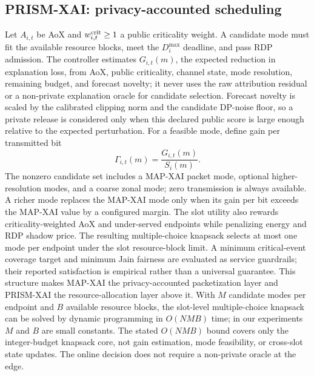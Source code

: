 \documentclass[conference]{IEEEtran}
\newcommand{\method}{PRISM-XAI}
\newcommand{\mapxai}{MAP-XAI}
\newcommand{\medmath}[1]{#1}
\begin{document}
\subsection{PRISM-XAI: privacy-accounted scheduling}
\begingroup
\setlength{\abovedisplayskip}{4pt}
\setlength{\belowdisplayskip}{4pt}
\setlength{\abovedisplayshortskip}{2pt}
\setlength{\belowdisplayshortskip}{2pt}
Let $A_{i,t}$ be AoX and $w^{\rm crit}_{i,t}\geq 1$ a public
criticality weight. A candidate mode must fit the available resource
blocks, meet the $D_i^{\max}$ deadline, and pass RDP admission. The
controller estimates $G_{i,t}(m)$, the expected reduction in explanation
loss, from AoX, public criticality, channel state, mode resolution, remaining
budget, and forecast novelty; it never uses the raw attribution residual or a
non-private explanation oracle for candidate selection. Forecast novelty is
scaled by the calibrated clipping norm and the candidate DP-noise floor, so a
private release is considered only when this declared public score is large
enough relative to the expected perturbation.
For a feasible mode, define gain per transmitted bit
\begin{equation}
\medmath{\Gamma_{i,t}(m)=\frac{G_{i,t}(m)}{S_i(m)}.}
\label{eq:gainbit}
\end{equation}
The nonzero candidate set includes a \mapxai{} packet mode, optional
higher-resolution modes, and a coarse zonal mode; zero transmission is
always available. A richer mode replaces the \mapxai{} mode only when
its gain per bit exceeds the \mapxai{} value by a configured margin. The
slot utility also rewards criticality-weighted AoX and under-served
endpoints while penalizing energy and RDP shadow price. The resulting
multiple-choice knapsack selects at most one mode per endpoint under the
slot resource-block limit. A minimum critical-event coverage target and
minimum Jain fairness are evaluated as service guardrails; their
reported satisfaction is empirical rather than a universal guarantee. This structure
makes \mapxai{} the privacy-accounted packetization layer and \method{} the
resource-allocation layer above it. With $M$ candidate modes per endpoint
and $B$ available resource blocks, the slot-level multiple-choice knapsack
can be solved by dynamic programming in $O(NMB)$ time; in our experiments
$M$ and $B$ are small constants. The stated $O(NMB)$ bound covers only the integer-budget knapsack
core, not gain estimation, mode feasibility, or cross-slot state updates.
The online decision does not require a non-private oracle at the edge.
\end{document}
